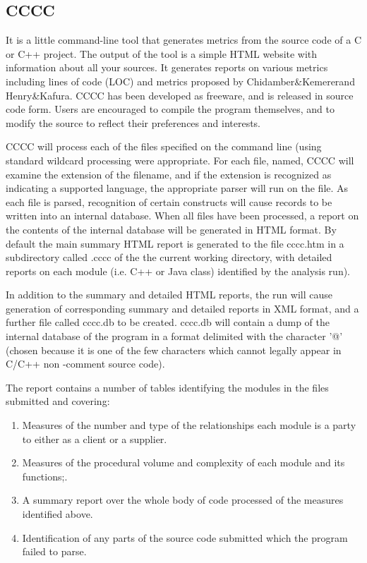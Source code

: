\subsection{CCCC}

It is a little command-line tool that generates metrics from the source code of a C or C++ project. The output of the tool is a simple HTML website with information about all your sources. It generates reports on various metrics including lines of code (LOC) and metrics proposed by Chidamber\&Kemererand Henry\&Kafura. CCCC has been developed as freeware, and is released in source code form. Users are encouraged to compile the program themselves, and to modify the source to reflect their preferences and interests.

CCCC will process each of the files specified on the command line (using standard wildcard processing were appropriate. For each file, named, CCCC will examine the extension of the filename, and if the extension is recognized as indicating a supported language, the appropriate parser will run on the file. As each file is parsed, recognition of certain constructs will cause records to be written into an internal database. When all files have been processed, a report on the contents of the internal database
will be generated in HTML format. By default the main summary HTML report is generated to the file cccc.htm in a subdirectory called .cccc of the the current working directory, with detailed reports on each module (i.e. C++ or Java class) identified by the analysis run).

In addition to the summary and detailed HTML reports, the run will cause generation of corresponding summary and detailed reports in XML format, and a further file called cccc.db to be created. cccc.db will contain a dump of the internal database of the program in a format delimited with the character '@' (chosen because it is one of the few characters which cannot legally appear in C/C++ non -comment source code).

The report contains a number of tables identifying the modules in the files submitted and covering:
\begin{enumerate}
	\item Measures of the number and type of the relationships each module is a party to either as a client or a supplier.
	\item Measures of the procedural volume and complexity of each module and its functions;. 
	\item A summary report over the whole body of code processed of the measures identified above.
	\item Identification of any parts of the source code submitted which the program failed to parse.
\end{enumerate}

